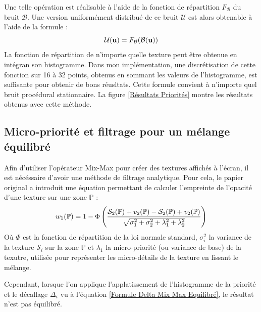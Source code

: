 \documentclass{article}
\begin{document}
Une telle opération est réalisable à l'aide de la fonction de répartition
$F_{\mathcal{B}}$ du bruit $\mathcal{B}$. Une version uniformément distribué de
ce bruit $\mathcal{U}$ est alors obtenable à l'aide de la formule :
\begin{equation}\centering\label{Unfirmisation procédurale}
    \mathcal{U}(\mathbf{u}) = F_{\mathcal{B}}(\mathcal{B}(\mathbf{u}))
\end{equation}
La fonction de répartition de n'importe quelle texture peut être obtenue en intégran son histogramme. Dans mon implémentation, une discrétisation de cette fonction sur 16 à 32 points, obtenus en sommant les valeurs de l'histogramme, est suffisante pour obtenir de bons réusltats. Cette formule convient à n'importe quel bruit procédural stationnaire. La figure \ref{Résultats Priorités} montre les résultats obtenus avec cette méthode.

\subsection{Micro-priorité et filtrage pour un mélange équilibré}

Afin d'utiliser l'opérateur Mix-Max pour créer des textures affichés à l'écran,
il est nécéssaire d'avoir une méthode de filtrage analytique. Pour cela, le
papier original \cite{mixmax} a introduit une équation permettant de calculer
l'empreinte de l'opacité d'une texture sur une zone $\mathbb{P}$ :
\begin{equation}\centering\label{FS24_micro-priorite}
    w_1(\mathbb{P}) = 1 - \Phi \left(
    \frac{
            \mathcal{S}_2(\mathbb{P}) + v_2(\mathbb{P}) - \mathcal{S}_2(\mathbb{P}) + v_2(\mathbb{P})
        }{
            \sqrt{\sigma_1^2 + \sigma_2^2 + \lambda_1^2 + \lambda_2^2}
        }
    \right)
\end{equation}
Où $\Phi$ est la fonction de répartition de la loi normale standard, $\sigma_i^2$ la variance de la texture $\mathcal{S}_i$ sur la zone $\mathbb{P}$ et $\lambda_1$ la micro-priorité (ou variance de base) de la texutre, utilisée pour représenter les micro-détails de la texture en lissant le mélange.

Cependant, lorsque l'on applique l'applatissement de l'histogramme de la
priorité et le décallage $\Delta_i$ vu à l'équation \ref{Formule Delta Mix Max
    Equilibré}, le résultat n'est pas équilibré.
\end{document}
